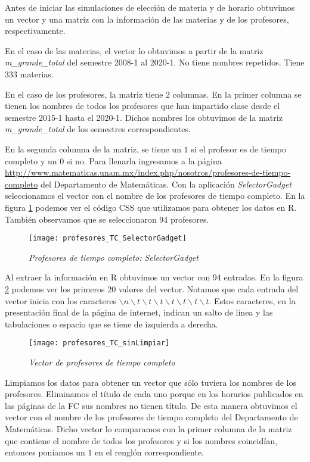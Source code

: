 Antes de iniciar las simulaciones de elección de materia y de horario obtuvimos un vector y una matriz con la información de las materias y de los profesores, respectivamente.

En el caso de las materias, el vector lo obtuvimos a partir de la matriz \textit{m\_grande\_total} del semestre 2008-1 al 2020-1. No tiene nombres repetidos. Tiene 333 materias.

En el caso de los profesores, la matriz tiene 2 columnas. En la primer columna se tienen los nombres de todos los profesores que han impartido clase desde el semestre 2015-1 hasta el 2020-1. Dichos nombres los obtuvimos de la matriz \textit{m\_grande\_total} de los semestres correspondientes.

En la segunda columna de la matriz, se tiene un $1$ si el profesor es de tiempo completo y un $0$ si no. Para llenarla ingresamos a la página \url{http://www.matematicas.unam.mx/index.php/nosotros/profesores-de-tiempo-completo} del Departamento de Matemáticas. Con la aplicación \textit{SelectorGadget} seleccionamos el vector con el nombre de los profesores de tiempo completo. En la figura \ref{profTC_SelectorGadget} podemos ver el código CSS que utilizamos para obtener los datos en R. También observamos que se seleccionaron 94 profesores.

\begin{figure}[H]
\centering
\texttt{[image: profesores\_TC\_SelectorGadget]} %
\caption{\textit{Profesores de tiempo completo: SelectorGadget}}\label{profTC_SelectorGadget}
\end{figure}

Al extraer la información en R obtuvimos un vector con 94 entradas. En la figura \ref{profTC_sinLimpiar} podemos ver los primeros 20 valores del vector. Notamos que cada entrada del vector inicia con los caracteres $\backslash n \backslash t \backslash t \backslash t \backslash t \backslash t \backslash t \backslash t$. Estos caracteres, en la presentación final de la página de internet, indican un salto de línea y las tabulaciones o espacio que se tiene de izquierda a derecha.

\begin{figure}[H]
\centering
\texttt{[image: profesores\_TC\_sinLimpiar]} %
\caption{\textit{Vector de profesores de tiempo completo}}\label{profTC_sinLimpiar}
\end{figure}

Limpiamos los datos para obtener un vector que sólo tuviera los nombres de los profesores. Eliminamos el título de cada uno porque en los horarios publicados en las páginas de la FC sus nombres no tienen título. De esta manera obtuvimos el vector con el nombre de los profesores de tiempo completo del Departamento de Matemáticas. Dicho vector lo comparamos con la primer columna de la matriz que contiene el nombre de todos los profesores y si los nombres coincidían, entonces poníamos un $1$ en el renglón correspondiente.

